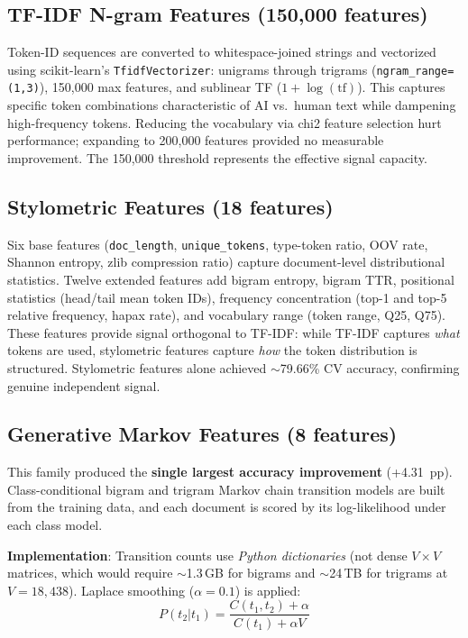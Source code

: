 \documentclass[11pt]{article}
\begin{document}
\subsection{TF-IDF N-gram Features (150,000 features)}

Token-ID sequences are converted to whitespace-joined strings and vectorized using scikit-learn's \texttt{TfidfVectorizer}: unigrams through trigrams (\texttt{ngram\_range=(1,3)}), 150,000 max features, and sublinear TF ($1 + \log(\text{tf})$). This captures specific token combinations characteristic of AI vs.\ human text while dampening high-frequency tokens. Reducing the vocabulary via chi2 feature selection hurt performance; expanding to 200,000 features provided no measurable improvement. The 150,000 threshold represents the effective signal capacity.

\subsection{Stylometric Features (18 features)}

Six base features (\texttt{doc\_length}, \texttt{unique\_tokens}, type-token ratio, OOV rate, Shannon entropy, zlib compression ratio) capture document-level distributional statistics. Twelve extended features add bigram entropy, bigram TTR, positional statistics (head/tail mean token IDs), frequency concentration (top-1 and top-5 relative frequency, hapax rate), and vocabulary range (token range, Q25, Q75). These features provide signal orthogonal to TF-IDF: while TF-IDF captures \textit{what} tokens are used, stylometric features capture \textit{how} the token distribution is structured. Stylometric features alone achieved ${\sim}$79.66\% CV accuracy, confirming genuine independent signal.

\subsection{Generative Markov Features (8 features)}
\label{sec:gen}

This family produced the \textbf{single largest accuracy improvement} (+4.31~pp). Class-conditional bigram and trigram Markov chain transition models are built from the training data, and each document is scored by its log-likelihood under each class model.

\textbf{Implementation}: Transition counts use \textit{Python dictionaries} (not dense $V{\times}V$ matrices, which would require ${\sim}$1.3\,GB for bigrams and ${\sim}$24\,TB for trigrams at $V{=}18{,}438$). Laplace smoothing ($\alpha{=}0.1$) is applied:
$$P(t_2|t_1) = \frac{C(t_1,t_2)+\alpha}{C(t_1)+\alpha V}$$
\end{document}
